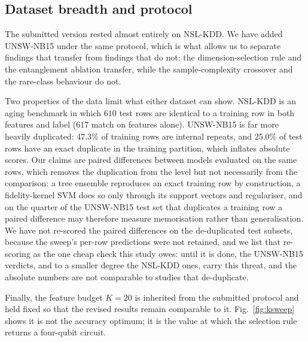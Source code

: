 \subsection{Dataset breadth and protocol}
\begin{revbody}

The submitted version rested almost entirely on NSL-KDD. We have added
UNSW-NB15 under the same protocol, which is what allows us to separate findings
that transfer from findings that do not: the dimension-selection rule and the
entanglement ablation transfer, while the sample-complexity crossover and the
rare-class behaviour do not.

Two properties of the data limit what either dataset can show. NSL-KDD is an
aging benchmark in which $610$ test rows are identical to a training row in both
features and label ($617$ match on features alone). UNSW-NB15 is far more heavily
duplicated: $47.3\%$ of training rows are internal repeats, and $25.0\%$ of test
rows have an exact duplicate in the training partition, which
inflates absolute scores. Our claims are paired differences between models
evaluated on the same rows, which removes the duplication from the level but
not necessarily from the comparison: a tree ensemble reproduces an exact
training row by construction, a fidelity-kernel SVM does so only through its
support vectors and regulariser, and on the quarter of the UNSW-NB15 test set
that duplicates a training row a paired difference may therefore measure
memorisation rather than generalisation. We have not re-scored the paired
differences on the de-duplicated test subsets, because the sweep's per-row
predictions were not retained, and we list that re-scoring as the one cheap
check this study owes: until it is done, the UNSW-NB15 verdicts, and to a
smaller degree the NSL-KDD ones, carry this threat, and the absolute numbers
are not comparable to studies that de-duplicate.

Finally, the feature budget $K=20$ is inherited from the submitted protocol and
held fixed so that the revised results remain comparable to it.
Fig.~\ref{fig:ksweep} shows it is not the accuracy optimum; it is the value at
which the selection rule returns a four-qubit circuit.
\end{revbody}
